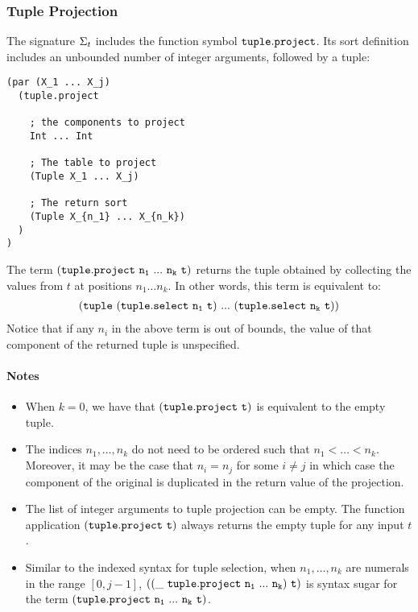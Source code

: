 \documentclass[english,a4paper,10pt]{article}
\begin{document}
\subsubsection{Tuple Projection}
\label{sec:tup-project}
The signature $\Sigma_{t}$ includes 
the function symbol ${\tt tuple.project}$.
Its sort definition includes an unbounded number of integer arguments, followed
by a tuple:
\begin{verbatim}
(par (X_1 ... X_j) 
  (tuple.project
    
    ; the components to project
    Int ... Int
  
    ; The table to project
    (Tuple X_1 ... X_j)
    
    ; The return sort
    (Tuple X_{n_1} ... X_{n_k})
  )
)
\end{verbatim}
The term
$\syntax{(tuple.project\ n_1\ ...\ n_k\ t)}$
returns the tuple obtained by collecting the
values from $t$ at positions $n_1 \ldots n_k$.
In other words, this term is equivalent to:
\begin{align*}
{\tt (tuple\ (tuple.select\ n_1\ t)\ ...\ (tuple.select\ n_k\ t))}
\end{align*}
Notice that if any $n_i$ in the above term is out of bounds, the value of
that component of the returned tuple is unspecified.

\paragraph{Notes}
\begin{itemize}
\item
When $k=0$,
we have that $\syntax{(tuple.project\ t)}$ is equivalent to the empty tuple.
\item
The indices $n_1, \ldots, n_k$ do not need to be ordered such that $n_1 < \ldots < n_k$.
Moreover, it may be the case that $n_i = n_j$ for some $i \neq j$ in which
case the component of the original is duplicated in the return value of the projection.
\item
The list of integer arguments to tuple projection can be empty.
The function application
$\syntax{(tuple.project\ t)}$ always returns the empty tuple for any input $t$.
\item Similar to the indexed syntax for tuple selection,
when $n_1, \ldots, n_k$ are numerals in the range $[0, j-1]$,
$\syntax{((\_\ tuple.project\ n_1\ ...\ n_k)\ t)}$ is syntax sugar for the term
$\syntax{(tuple.project\ n_1\ ...\ n_k\ t)}$.
\end{itemize}
\end{document}
